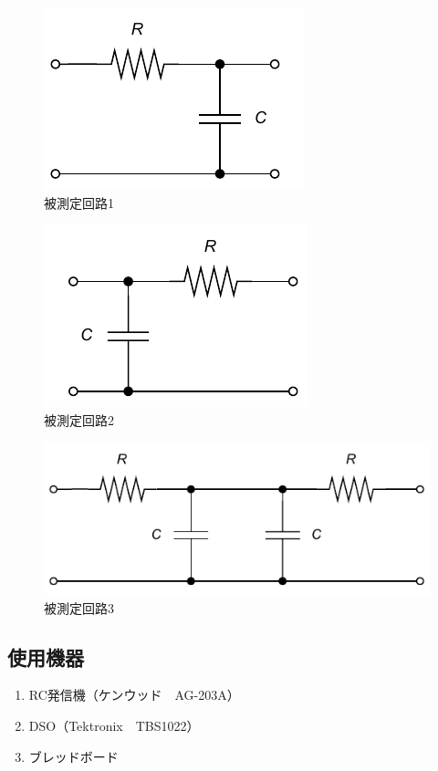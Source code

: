 \begin{figure}[H]
    \begin{center}
        \includegraphics[]{figure5.drawio.pdf}
        \caption{被測定回路1}
    \end{center}
\end{figure}

\begin{figure}[H]
    \begin{center}
        \includegraphics[]{figure6.drawio.pdf}
        \caption{被測定回路2}
    \end{center}
\end{figure}

\begin{figure}[H]
    \begin{center}
        \includegraphics[]{figure7.drawio.pdf}
        \caption{被測定回路3}
    \end{center}
\end{figure}

\subsection{使用機器}
\begin{enumerate}
    \item RC発信機（ケンウッド　AG-203A）
    \item DSO（Tektronix　TBS1022）
    \item ブレッドボード
\end{enumerate}

\newpage